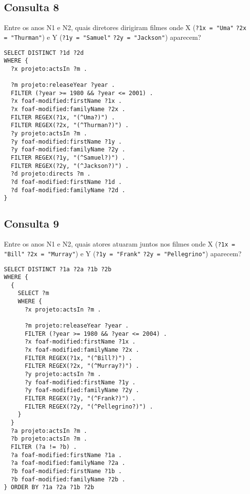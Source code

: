 \documentclass{article}
\newcommand{\code}[1]{\lstinline[mathescape=true]{#1}}
\begin{document}
\subsection{Consulta 8}
Entre os anos N1 e N2, quais diretores dirigiram filmes onde X (\code{?1x = "Uma"} \code{?2x = "Thurman"}) e Y (\code{?1y = "Samuel"} \code{?2y = "Jackson"}) aparecem?
\begin{lstlisting}[basicstyle=\ttfamily,frame=single]
SELECT DISTINCT ?1d ?2d
WHERE {
  ?x projeto:actsIn ?m .

  ?m projeto:releaseYear ?year .
  FILTER (?year >= 1980 && ?year <= 2001) .
  ?x foaf-modified:firstName ?1x .
  ?x foaf-modified:familyName ?2x .
  FILTER REGEX(?1x, "(^Uma?)") .
  FILTER REGEX(?2x, "(^Thurman?)") .
  ?y projeto:actsIn ?m .
  ?y foaf-modified:firstName ?1y .
  ?y foaf-modified:familyName ?2y .
  FILTER REGEX(?1y, "(^Samuel?)") .
  FILTER REGEX(?2y, "(^Jackson?)") .
  ?d projeto:directs ?m .
  ?d foaf-modified:firstName ?1d .
  ?d foaf-modified:familyName ?2d .
}
\end{lstlisting}
\subsection{Consulta 9}
Entre os anos N1 e N2, quais atores atuaram juntos nos filmes onde X (\code{?1x = "Bill"} \code{?2x = "Murray"}) e Y (\code{?1y = "Frank"} \code{?2y = "Pellegrino"}) aparecem?
\begin{lstlisting}[basicstyle=\ttfamily,frame=single]
SELECT DISTINCT ?1a ?2a ?1b ?2b
WHERE {
  {
    SELECT ?m
    WHERE {
      ?x projeto:actsIn ?m .

      ?m projeto:releaseYear ?year .
      FILTER (?year >= 1980 && ?year <= 2004) .
      ?x foaf-modified:firstName ?1x .
      ?x foaf-modified:familyName ?2x .
      FILTER REGEX(?1x, "(^Bill?)") .
      FILTER REGEX(?2x, "(^Murray?)") .
      ?y projeto:actsIn ?m .
      ?y foaf-modified:firstName ?1y .
      ?y foaf-modified:familyName ?2y .
      FILTER REGEX(?1y, "(^Frank?)") .
      FILTER REGEX(?2y, "(^Pellegrino?)") .
    }
  }
  ?a projeto:actsIn ?m .
  ?b projeto:actsIn ?m .
  FILTER (?a != ?b) .
  ?a foaf-modified:firstName ?1a .
  ?a foaf-modified:familyName ?2a .
  ?b foaf-modified:firstName ?1b .
  ?b foaf-modified:familyName ?2b .
} ORDER BY ?1a ?2a ?1b ?2b
\end{lstlisting}
\end{document}
